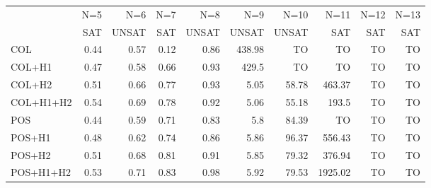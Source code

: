 \begin{tabular}[c]{l|r|r|r|r|r|r|r|r|r}\tiny
               & N=5  & N=6  & N=7  & N=8   &    N=9 &   N=10 &    N=11& N=12& N=13 \\
               & SAT  & UNSAT& SAT  & UNSAT &  UNSAT &  UNSAT &    SAT & SAT & SAT \\\hline
    COL        & \alert{0.44 }& \alert{0.57 }& \alert{0.12 }&  0.86 &  438.98&      TO&      TO&   TO& TO \\
    COL+H1     & 0.47 & 0.58 & 0.66 &  0.93 &   429.5&      TO&      TO&   TO& TO \\
    COL+H2     & 0.51 & 0.66 & 0.77 &  0.93 &    \alert{5.05}&   58.78&  463.37&   TO& TO \\
    COL+H1+H2  & 0.54 & 0.69 & 0.78 &  0.92 &    5.06&   \alert{55.18}&   \alert{193.5}&   TO& TO \\
    POS        & \alert{0.44 }& 0.59 & 0.71 &  \alert{0.83 }&     5.8&   84.39&      TO&   TO& TO \\
    POS+H1     & 0.48 & 0.62 & 0.74 &  0.86 &    5.86&   96.37&  556.43&   TO& TO \\
    POS+H2     & 0.51 & 0.68 & 0.81 &  0.91 &    5.85&   79.32&  376.94&   TO& TO \\
    POS+H1+H2  & 0.53 & 0.71 & 0.83 &  0.98 &    5.92&   79.53& 1925.02&   TO& TO 
\end{tabular}
